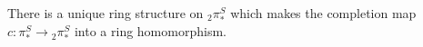 \documentclass{MetricNotes2023}
\def\inte{\ensuremath\mathbb{Z}}
\begin{document}

\begin{lemma}\label{2504071013}
There is a unique ring structure on \(\text{}_2\pi_*^S\) which makes the completion map \(c : \pi_*^S \to \text{}_2\pi_*^S\) into a ring homomorphism. 
\end{lemma}
\end{document}
